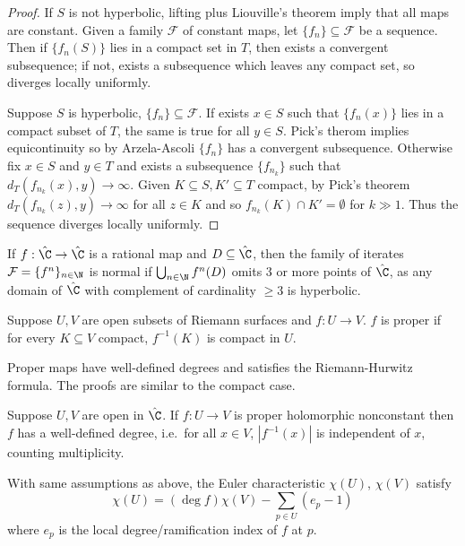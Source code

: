 \documentclass[a4paper]{article}
\begin{document}
\begin{proof}
  If \(S\) is not hyperbolic, lifting plus Liouville's theorem imply that all maps are constant. Given a family \(\mathcal F\) of constant maps, let \(\{f_n\} \subseteq \mathcal F\) be a sequence. Then if \(\{f_n(S)\}\) lies in a compact set in \(T\), then exists a convergent subsequence; if not, exists a subsequence which leaves any compact set, so diverges locally uniformly.

  Suppose \(S\) is hyperbolic, \(\{f_n\} \subseteq \mathcal F\). If exists \(x \in S\) such that \(\{f_n(x)\}\) lies in a compact subset of \(T\), the same is true for all \(y \in S\). Pick's therom implies equicontinuity so by Arzela-Ascoli \(\{f_n\}\) has a convergent subsequence. Otherwise fix \(x \in S\) and \(y \in T\) and exists a subsequence \(\{f_{n_k}\}\) such that \(d_T(f_{n_k}(x), y) \to \infty\). Given \(K \subseteq S, K' \subseteq T\) compact, by Pick's theorem \(d_T(f_{n_k}(z), y) \to \infty\) for all \(z \in K\) and so \(f_{n_k}(K) \cap K' = \emptyset\) for \(k \gg 1\). Thus the sequence diverges locally uniformly.
\end{proof}

\begin{eg}
  If \(f: \hat \C \to \hat \C\) is a rational map and \(D \subseteq \hat \C\), then the family of iterates \(\mathcal F = \{f^n\}_{n \in \N}\) is normal if \(\bigcup_{n \in \N} f^n(D)\) omits 3 or more points of \(\hat \C\), as any domain of \(\hat \C\) with complement of cardinality \(\geq 3\) is hyperbolic.
\end{eg}

\begin{definition}
  Suppose \(U, V\) are open subsets of Riemann surfaces and \(f: U \to V\). \(f\) is proper if for every \(K \subseteq V\) compact, \(f^{-1}(K)\) is compact in \(U\).
\end{definition}

Proper maps have well-defined degrees and satisfies the Riemann-Hurwitz formula. The proofs are similar to the compact case.

\begin{proposition}
  Suppose \(U, V\) are open in \(\hat \C\). If \(f: U \to V\) is proper holomorphic nonconstant then \(f\) has a well-defined degree, i.e.\ for all \(x\in V\), \(|f^{-1}(x)|\) is independent of \(x\), counting multiplicity.
\end{proposition}

\begin{theorem}
  With same assumptions as above, the Euler characteristic \(\chi(U)\), \(\chi(V)\) satisfy
  \[
    \chi(U) = (\deg f) \chi(V) - \sum_{p \in U}(e_p - 1)
  \]
  where \(e_p\) is the local degree/ramification index of \(f\) at \(p\).
\end{theorem}
\end{document}
